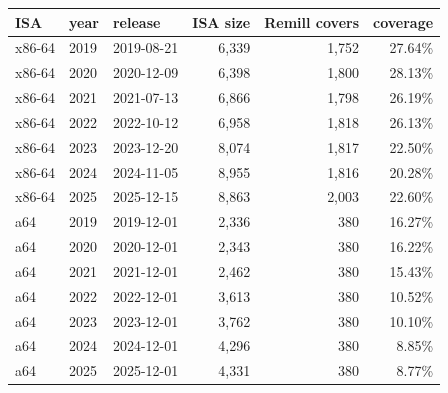 \begin{tabular}{lllrrr}
\toprule
ISA & year & release & ISA size & Remill covers & coverage \\
\midrule
x86-64 & 2019 & 2019-08-21 & 6,339 & 1,752 & 27.64\% \\
x86-64 & 2020 & 2020-12-09 & 6,398 & 1,800 & 28.13\% \\
x86-64 & 2021 & 2021-07-13 & 6,866 & 1,798 & 26.19\% \\
x86-64 & 2022 & 2022-10-12 & 6,958 & 1,818 & 26.13\% \\
x86-64 & 2023 & 2023-12-20 & 8,074 & 1,817 & 22.50\% \\
x86-64 & 2024 & 2024-11-05 & 8,955 & 1,816 & 20.28\% \\
x86-64 & 2025 & 2025-12-15 & 8,863 & 2,003 & 22.60\% \\
\midrule
a64 & 2019 & 2019-12-01 & 2,336 & 380 & 16.27\% \\
a64 & 2020 & 2020-12-01 & 2,343 & 380 & 16.22\% \\
a64 & 2021 & 2021-12-01 & 2,462 & 380 & 15.43\% \\
a64 & 2022 & 2022-12-01 & 3,613 & 380 & 10.52\% \\
a64 & 2023 & 2023-12-01 & 3,762 & 380 & 10.10\% \\
a64 & 2024 & 2024-12-01 & 4,296 & 380 & 8.85\% \\
a64 & 2025 & 2025-12-01 & 4,331 & 380 & 8.77\% \\
\bottomrule
\end{tabular}
